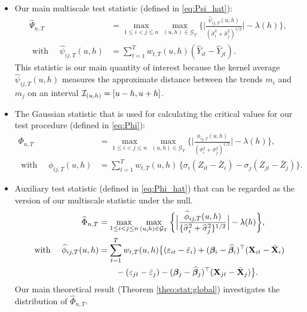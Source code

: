 \begin{itemize}
\item Our main multiscale test statistic (defined in \eqref{eq:Psi_hat}):
\begin{align*}
	\widehat{\Psi}_{n,T} & = \max_{1 \le i < j \le n} \max_{(u,h) \in \mathcal{G}_T} \bigg\{\Big|\frac{\widehat{\psi}_{ij,T}(u,h)}{(\widehat{\sigma}_i^2 + \widehat{\sigma}_j^2)^{1/2}}\bigg| - \lambda(h)\Bigg\},\\
   \text{ with  } \quad    \widehat{\psi}_{ij,T}(u,h) &= \sum\limits_{t=1}^T w_{t,T}(u,h)(\widehat{Y}_{it} - \widehat{Y}_{jt}). \nonumber
\end{align*}
This statistic is our main quantity of interest because the kernel average $\widehat{\psi}_{ij,T}(u,h)$ measures the approximate distance between the trends $m_i$ and $m_j$ on an interval $\mathcal{I}_{(u, h)} = [u-h, u+h]$.


\item The Gaussian statistic that is used for calculating the critical values for our test procedure (defined in \eqref{eq:Phi}):
\begin{align*}
	\Phi_{n,T}  &= \max_{1 \le i < j \le n} \max_{(u,h) \in \mathcal{G}_T} \bigg\{\Big|\frac{\phi_{ij,T}(u,h)}{({\sigma}_i^2 + {\sigma}_j^2)^{1/2}}\Big| - \lambda(h)\bigg\},\\
   \text{ with  } \quad  	 \phi_{ij,T}(u,h) & = \sum\nolimits_{t=1}^T w_{t,T}(u,h) \, \big\{{\sigma}_i (Z_{it} - \bar{Z}_i) - {\sigma}_j (Z_{jt} - \bar{Z}_j) \big\}.\nonumber
\end{align*}

\item Auxiliary test statistic (defined in \eqref{eq:Phi_hat}) that can be regarded as the version of our multiscale statistic under the null.
\begin{align*}
	\widehat{\Phi}_{n,T} &= \max_{1 \le i < j \le n} \max_{(u,h) \in \mathcal{G}_T} \bigg\{\Big| \frac{\widehat{\phi}_{ij,T}(u,h)} {\{ \widehat{\sigma}_i^2 + \widehat{\sigma}_j^2 \}^{1/2}} \Big| - \lambda(h)\bigg\}, \\
   \text{ with  } \quad  	\widehat{\phi}_{ij,T}(u,h) &= \sum_{t=1}^T w_{t,T}(u,h) \big\{ (\varepsilon_{it} - \bar{\varepsilon}_i) + (\bm{\beta}_i - \widehat{\bm{\beta}}_i)^\top (\mathbf{X}_{it} - \bar{\mathbf{X}}_{i})  \nonumber \\
	&\quad\quad - (\varepsilon_{jt} - \bar{\varepsilon}_j) -  (\bm{\beta}_j - \widehat{\bm{\beta}}_j)^\top (\mathbf{X}_{jt} - \bar{\mathbf{X}}_{j})\big\}.\nonumber 
\end{align*}
Our main theoretical result (Theorem \ref{theo:stat:global}) investigates the distribution of $\widehat{\Phi}_{n,T}$.


\end{itemize}
